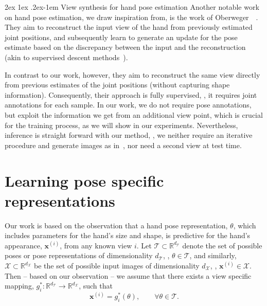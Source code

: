 \documentclass[10pt,twocolumn,letterpaper]{article}
\makeatletter
\renewcommand{\paragraph}{%
  \@startsection{paragraph}{4}%
  {\z@}{2ex \@plus 1ex \@minus .2ex}{-1em}%
  {\normalfont\normalsize\bfseries}%
}
\makeatother
\begin{document}
\paragraph{View synthesis for hand pose estimation}
Another notable work on hand pose estimation, we draw inspiration from, 
is the work of Oberweger~\etal~\cite{Oberweger2015iccv_feedbackloop}.
They aim to reconstruct the input view of the hand from 
previously estimated joint positions, and subsequently learn to
generate an update for the pose estimate
based on the discrepancy between the input and the reconstruction
(akin to supervised descent 
methods~\cite{Sheerman2013fg_nonlinearpredictors,Xiong2013cvpr_superviseddescent}).

In contrast to our work, however, they aim to reconstruct the same view 
directly from previous estimates of the joint positions (without capturing shape information).
Consequently, their approach is fully supervised, 
\ie, it requires joint annotations for each sample.
In our work, we do not require pose annotations, 
but exploit the information we get from an additional view point,
which is crucial for the training process, as we will show in our experiments.
Nevertheless, inference is straight forward with our method, \ie, 
we neither require an iterative procedure and generate images  
as in~\cite{Oberweger2015iccv_feedbackloop}, 
nor need a second view at test time.


\section{Learning pose specific representations}
Our work is based on the observation that 
a hand pose representation, $\theta$,
which includes parameters for the hand's size and shape,
is predictive for the hand's appearance, 
$\mathbf{x}^{(i)}$,
from any known view $i$. 
Let $\mathcal{T} \subset \mathbb{R}^{d_{\mathcal{T}}}$ denote the set of possible 
poses or pose representations of dimensionality $d_{\mathcal{T}}$,
\ie, $\theta \in \mathcal{T}$, and similarly,
$\mathcal{X} \subset \mathbb{R}^{d_{\mathcal{X}}}$ be the set of possible input images of
dimensionality $d_{\mathcal{X}}$, \ie, $\mathbf{x}^{(i)} \in \mathcal{X}$.
Then -- based on our observation -- we assume that there exists a view specific mapping, 
$g^{\ast}_{i} \colon \mathbb{R}^{d_{\mathcal{T}}} \rightarrow \mathbb{R}^{d_{\mathcal{X}}}$,
such that
\begin{equation}
 \mathbf{x}^{(i)} = g^{\ast}_{i} ( \theta ), \qquad \forall \theta \in \mathcal{T}.
 \label{equ:posetoappearance}
\end{equation}
\end{document}
